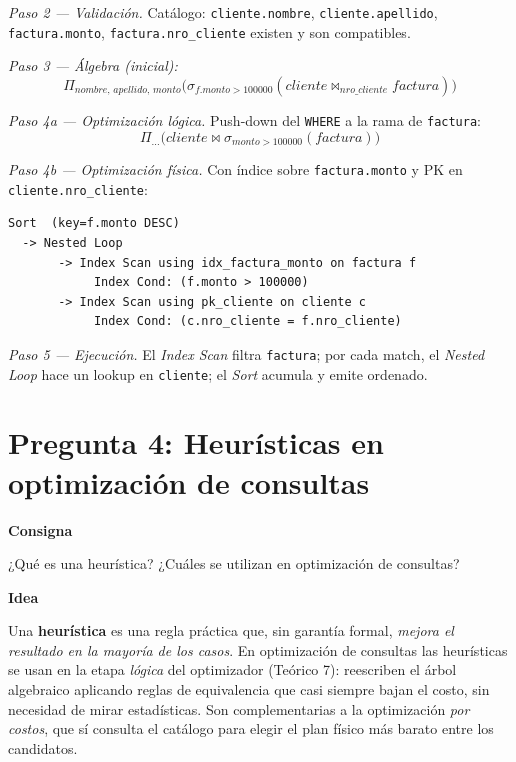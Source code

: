 \documentclass[11pt,a4paper]{article}
\newcommand{\itemcabecera}[1]{\noindent\textbf{#1}\par\medskip}
\newcommand{\bloqueConsigna}{\itemcabecera{Consigna}}
\newcommand{\bloqueIdea}{\itemcabecera{Idea}}
\begin{document}
\textit{Paso 2 --- Validación.} Catálogo: \texttt{cliente.nombre}, \texttt{cliente.apellido}, \texttt{factura.monto}, \texttt{factura.nro\_cliente} existen y son compatibles.

\textit{Paso 3 --- Álgebra (inicial):}
\[
\Pi_{nombre,\,apellido,\,monto}\big(\sigma_{f.monto > 100000}(cliente \bowtie_{nro\_cliente} factura)\big)
\]

\textit{Paso 4a --- Optimización lógica.} Push-down del \texttt{WHERE} a la rama de \texttt{factura}:
\[
\Pi_{\ldots}\big(cliente \bowtie \sigma_{monto > 100000}(factura)\big)
\]

\textit{Paso 4b --- Optimización física.} Con índice sobre \texttt{factura.monto} y PK en \texttt{cliente.nro\_cliente}:

\begin{lstlisting}[style=plain]
Sort  (key=f.monto DESC)
  -> Nested Loop
       -> Index Scan using idx_factura_monto on factura f
            Index Cond: (f.monto > 100000)
       -> Index Scan using pk_cliente on cliente c
            Index Cond: (c.nro_cliente = f.nro_cliente)
\end{lstlisting}

\textit{Paso 5 --- Ejecución.} El \emph{Index Scan} filtra \texttt{factura}; por cada match, el \emph{Nested Loop} hace un lookup en \texttt{cliente}; el \emph{Sort} acumula y emite ordenado.

\section{Pregunta 4: Heurísticas en optimización de consultas}

\bloqueConsigna

¿Qué es una heurística? ¿Cuáles se utilizan en optimización de consultas?

\bloqueIdea

Una \textbf{heurística} es una regla práctica que, sin garantía formal, \emph{mejora el resultado en la mayoría de los casos}. En optimización de consultas las heurísticas se usan en la etapa \emph{lógica} del optimizador (Teórico 7): reescriben el árbol algebraico aplicando reglas de equivalencia que casi siempre bajan el costo, sin necesidad de mirar estadísticas. Son complementarias a la optimización \emph{por costos}, que sí consulta el catálogo para elegir el plan físico más barato entre los candidatos.
\end{document}

